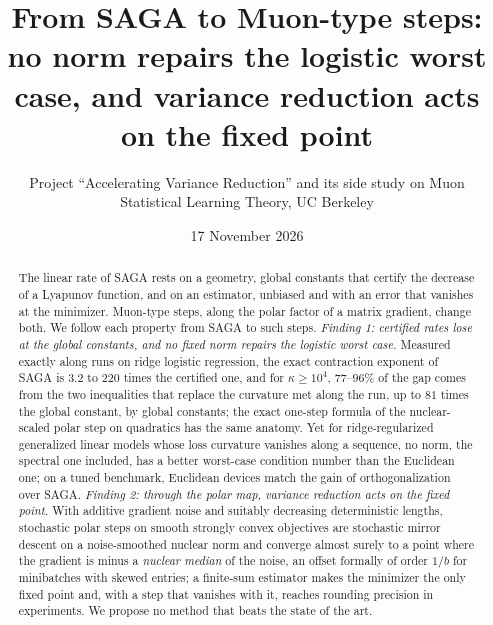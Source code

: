 \documentclass[10pt]{article}
\title{\vspace{-2.2em}From SAGA to Muon-type steps:\\ no norm repairs the logistic worst case, and variance reduction
acts on the fixed point}
\author{Project ``Accelerating Variance Reduction'' and its side study on Muon\\ Statistical Learning Theory, UC Berkeley}
\date{\vspace{-0.4em}17 November 2026}
\makeatletter
\renewcommand\section{\@startsection{section}{1}{\z@}{-2.4ex \@plus -0.6ex \@minus -.2ex}{1.2ex \@plus .2ex}{\normalfont\large\bfseries}}
\theoremstyle{remark}
\makeatother
\begin{document}
\maketitle

\begin{abstract}
The linear rate of SAGA rests on a geometry, global constants that certify the decrease of a Lyapunov function, and on
an estimator, unbiased and with an error that vanishes at the minimizer. Muon-type steps, along the polar factor of a
matrix gradient, change both. We follow each property from SAGA to such steps. \emph{Finding 1: certified rates lose at
the global constants, and no fixed norm repairs the logistic worst case.} Measured exactly along runs on ridge logistic
regression, the exact contraction exponent of SAGA is $3.2$ to $220$ times the certified one, and for $\kappa\ge10^4$,
$77$--$96\%$ of the gap comes from the two inequalities that replace the curvature met along the run, up to $81$ times
the global constant, by global constants; the exact one-step formula of the nuclear-scaled polar step on quadratics has
the same anatomy. Yet for ridge-regularized generalized linear models whose loss curvature vanishes along a sequence, no
norm, the spectral one included, has a better worst-case condition number than the Euclidean one; on a tuned benchmark,
Euclidean devices match the gain of orthogonalization over SAGA. \emph{Finding 2: through the polar map, variance
reduction acts on the fixed point.} With additive gradient noise and suitably decreasing deterministic lengths, stochastic polar steps
on smooth strongly convex objectives are stochastic mirror descent on a noise-smoothed nuclear norm and converge almost
surely to a point where the gradient is minus a \emph{nuclear median} of the noise, an offset formally of order $1/b$
for minibatches with skewed entries; a finite-sum estimator makes the minimizer the only fixed point and, with a step
that vanishes with it, reaches rounding precision in experiments. We propose no method that beats the state of the art.
\end{abstract}

\section{Introduction}\label{sec:intro}
\end{document}
